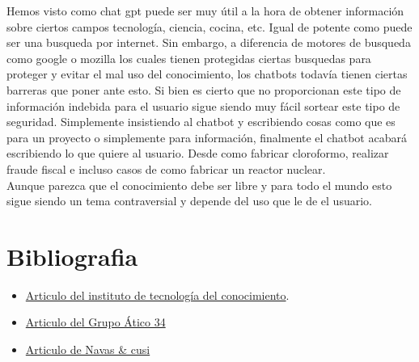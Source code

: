 \documentclass[12pt]{article}
\begin{document}
Hemos visto como chat gpt puede ser muy útil a la hora de obtener información sobre ciertos campos tecnología, ciencia, cocina, etc. Igual de potente como puede ser una busqueda por internet. Sin embargo, a diferencia de motores de busqueda como google o mozilla los cuales tienen protegidas ciertas busquedas para proteger y evitar el mal uso del conocimiento, los chatbots todavía tienen ciertas barreras que poner ante esto. Si bien es cierto que no proporcionan este tipo de información indebida para el usuario sigue siendo muy fácil sortear este tipo de seguridad. Simplemente insistiendo al chatbot y escribiendo cosas como que es para un proyecto o simplemente para información, finalmente el chatbot acabará escribiendo lo que quiere al usuario. Desde como fabricar cloroformo, realizar fraude fiscal e incluso casos de como fabricar un reactor nuclear.
\\
Aunque parezca que el conocimiento debe ser libre y para todo el mundo esto sigue siendo un tema contraversial y depende del uso que le de el usuario.

\clearpage
\section{Bibliografia}
\begin{itemize}
    \item \href{https://www.iic.uam.es/noticias/malos-usos-de-inteligencia-artificial-como-hacerles-frente/}{Articulo del instituto de tecnología del conocimiento}.
    \item \href{https://protecciondatos-lopd.com/empresas/mal-uso-inteligencia-artificial/}{Articulo del Grupo Ático 34}
    \item \href{https://www.navascusi.com/riesgos-inteligencia-artificial-usurpacion-identidad/}{Articulo de Navas \& cusi}
\end{itemize}
\end{document}
